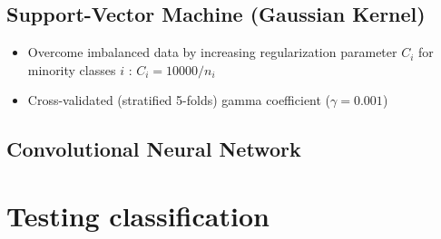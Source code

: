 \documentclass[c]{beamer}
\begin{document}
\subsection{Support-Vector Machine (Gaussian Kernel)}
\begin{frame}
\begin{itemize}
 \item Overcome imbalanced data by increasing regularization parameter $C_{i}$ for minority classes $i$ :  $C_{i} = 10000/n_{i}$
 \item Cross-validated (stratified 5-folds) gamma coefficient ($\gamma = 0.001$)
\end{itemize}
\end{frame}

\subsection{Convolutional Neural Network}
\begin{frame}

\end{frame}

\section{Testing classification}
\end{document}
